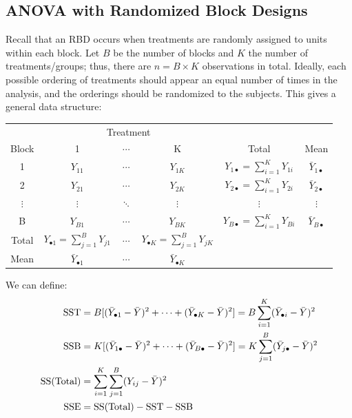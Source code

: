 \documentclass[12pt]{article}
\begin{document}
\subsection{ANOVA with Randomized Block Designs}

Recall that an RBD occurs when treatments are randomly assigned to units within each block. Let $B$ be the number of blocks and $K$ the number of treatments/groups; thus, there are $n = B \times K$ observations in total. Ideally, each possible ordering of treatments should appear an equal number of times in the analysis, and the orderings should be randomized to the subjects. This gives a general data structure:

\begin{center}
    \begin{tabular}{c c c c c c}
        & \multicolumn{3}{c}{Treatment} & &\\
        \cline{2-4}
        Block & 1 & $\cdots$ & K & Total & Mean\\
        \hline
        1 & $Y_{11}$ & $\cdots$ & $Y_{1K}$ & $Y_{1\bullet}=\sum_{i=1}^K Y_{1i}$ & $\bar{Y}_{1\bullet}$\\
        2 & $Y_{21}$ & $\cdots$ & $Y_{2K}$ & $Y_{2\bullet}=\sum_{i=1}^K Y_{2i}$ & $\bar{Y}_{2\bullet}$\\
        $\vdots$ & $\vdots$ & $\ddots$ & $\vdots$ & $\vdots$ & $\vdots$\\
        B & $Y_{B1}$ & $\cdots$ & $Y_{BK}$ & $Y_{B\bullet}=\sum_{i=1}^K Y_{Bi}$ & $\bar{Y}_{B\bullet}$\\
        \hline
        Total & $Y_{\bullet 1} = \sum_{j=1}^B Y_{j1}$ & $\cdots$ & $Y_{\bullet K} = \sum_{j=1}^B Y_{jK}$ & & \\
        Mean & $\bar{Y}_{\bullet 1}$ & $\cdots$ & $\bar{Y}_{\bullet K}$ & & \\
    \end{tabular}
\end{center}

We can define: \begin{align*}
    \text{SST} &= B[(\bar{Y}_{\bullet 1} - \Bar{Y})^2 + \dots + (\bar{Y}_{\bullet K} - \Bar{Y})^2] = B \sum_{i=1}^{K}(\bar{Y}_{\bullet i} - \bar{Y})^2\\
    \text{SSB} &= K[(\bar{Y}_{1\bullet} - \Bar{Y})^2 + \dots + (\bar{Y}_{B\bullet} - \Bar{Y})^2] = K \sum_{j=1}^{B}(\bar{Y}_{j\bullet} - \bar{Y})^2\\
    \text{SS(Total)} &= \sum_{i=1}^{K}\sum_{j=1}^{B}(Y_{ij} - \bar{Y})^2\\
    \text{SSE} &=  \text{SS(Total)} - \text{SST} - \text{SSB}\\
\end{align*}
\end{document}
